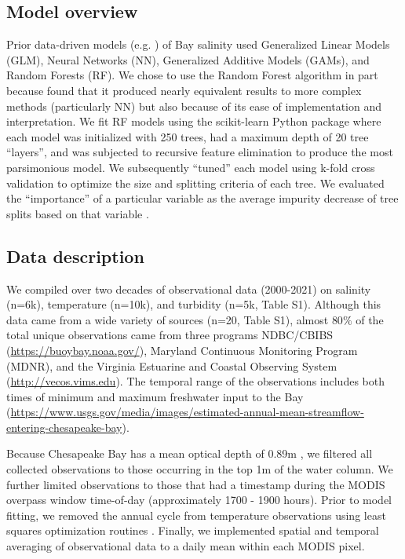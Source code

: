 \documentclass{article}
\begin{document}
\subsection{Model overview}

Prior data-driven models (e.g. \citet{urquhartGeospatialInterpolationMODISderived2013, vogelAssessingSatelliteSea2016}) of Bay salinity used Generalized Linear Models (GLM), Neural Networks (NN), Generalized Additive Models (GAMs), and Random Forests (RF). We chose to use the Random Forest algorithm in part because \citet{urquhartGeospatialInterpolationMODISderived2013} found that it produced nearly equivalent results to more complex methods (particularly NN) but also because of its ease of implementation and interpretation. We fit RF models using the scikit-learn Python package \citep{pedregosaScikitlearnMachineLearning2011} where each model was initialized with 250 trees, had a maximum depth of 20 tree “layers”, and was subjected to recursive feature elimination to produce the most parsimonious model. We subsequently “tuned” each model using k-fold cross validation to optimize the size and splitting criteria of each tree. We evaluated the “importance” of a particular variable as the average impurity decrease of tree splits based on that variable \citep{pedregosaScikitlearnMachineLearning2011}.

\subsection{Data description}

We compiled over two decades of observational data (2000-2021) on salinity (n=6k), temperature (n=10k), and turbidity (n=5k, Table S1). Although this data came from a wide variety of sources (n=20, Table S1), almost $80\%$ of the total unique observations came from three programs NDBC/CBIBS (\url{https://buoybay.noaa.gov/}), Maryland Continuous Monitoring Program (MDNR), and the Virginia Estuarine and Coastal Observing System (\url{http://vecos.vims.edu}). The temporal range of the observations includes both times of minimum and maximum freshwater input to the Bay (\url{https://www.usgs.gov/media/images/estimated-annual-mean-streamflow-entering-chesapeake-bay}).

Because Chesapeake Bay has a mean optical depth of 0.89m \citep{urquhartRemotelySensedEstimates2012}, we filtered all collected observations to those occurring in the top 1m of the water column. We further limited observations to those that had a timestamp during the MODIS overpass window time-of-day (approximately 1700 - 1900 hours). Prior to model fitting, we removed the annual cycle from temperature observations using least squares optimization routines \citep{virtanenSciPyFundamentalAlgorithms2020a}. Finally, we implemented spatial and temporal averaging of observational data to a daily mean within each MODIS pixel. 
\end{document}
